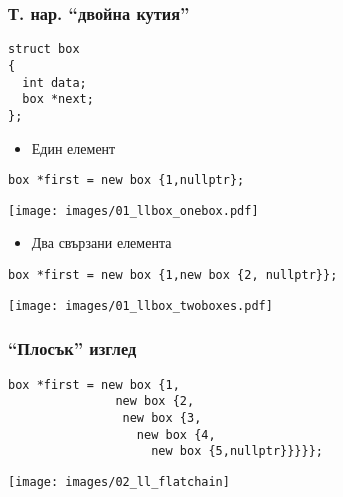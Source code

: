 \documentclass{beamer}
\begin{document}
\begin{frame}[fragile]
\frametitle{Т. нар. ``двойна кутия''}

\begin{flushleft}
\begin{lstlisting}
struct box
{
  int data;
  box *next;
};
\end{lstlisting}  
\end{flushleft}

\begin{itemize}
  \item  Един елемент
\end{itemize}

\begin{flushleft}
\begin{lstlisting}
box *first = new box {1,nullptr};
\end{lstlisting}  
\end{flushleft}

\texttt{[image: images/01\_llbox\_onebox.pdf]}

\vspace{-210px}

\begin{itemize}
  \item  Два свързани елемента
\end{itemize}

\begin{flushleft}
\begin{lstlisting}
box *first = new box {1,new box {2, nullptr}};
\end{lstlisting}  
\end{flushleft}

\texttt{[image: images/01\_llbox\_twoboxes.pdf]}


\end{frame}


\begin{frame}[fragile]
\frametitle{``Плосък'' изглед}

\begin{flushleft}
\begin{lstlisting}
box *first = new box {1,
               new box {2, 
                new box {3, 
                  new box {4, 
                    new box {5,nullptr}}}}};
\end{lstlisting}  
\end{flushleft}


\texttt{[image: images/02\_ll\_flatchain]}

\end{frame}
\end{document}
